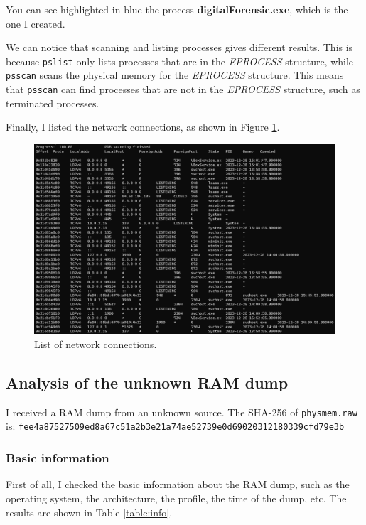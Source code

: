 \documentclass[12pt]{article}
\begin{document}
You can see highlighted in blue the process \textbf{digitalForensic.exe}, which is the one I created. 

We can notice that scanning and listing processes gives different results. This is because \texttt{pslist} only lists processes that are in the \textit{EPROCESS} structure, while \texttt{psscan} scans the physical memory for the \textit{EPROCESS} structure. This means that \texttt{psscan} can find processes that are not in the \textit{EPROCESS} structure, such as terminated processes. 

Finally, I listed the network connections, as shown in Figure \ref{fig:netscan}.

\begin{figure}
        \centering
        \includegraphics[width=\textwidth]{images/netscan.png}
        \caption{List of network connections.}
        \label{fig:netscan}
\end{figure}


\subsection{Analysis of the unknown RAM dump}

I received a RAM dump from an unknown source. 
The SHA-256 of \texttt{physmem.raw} is:
\texttt{fee4a87527509ed8a67c51a2b3e21a74ae52739e0d69020312180339cfd79e3b}

\subsubsection{Basic information}

First of all, I checked the basic information about the RAM dump, such as the operating system, the architecture, the profile, the time of the dump, etc. The results are shown in Table \ref{table:info}.
\end{document}
